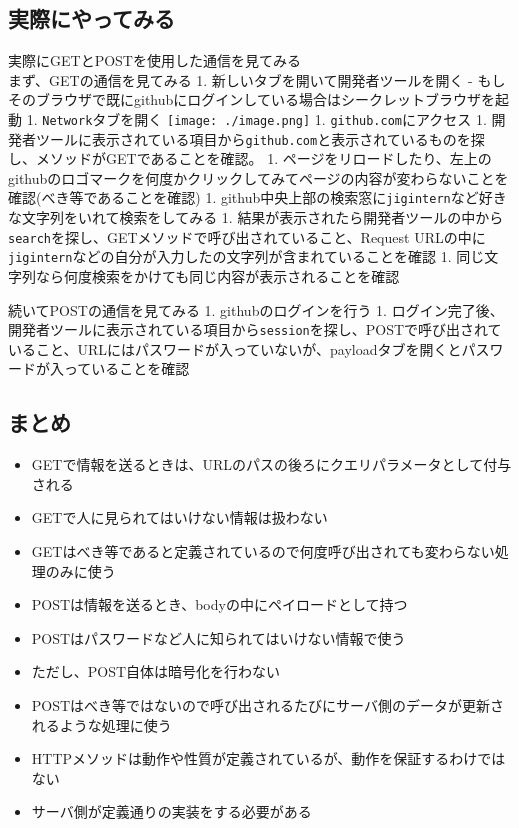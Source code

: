 \subsection{実際にやってみる}\label{ux5b9fux969bux306bux3084ux3063ux3066ux307fux308b}

実際にGETとPOSTを使用した通信を見てみる\\
まず、GETの通信を見てみる 1. 新しいタブを開いて開発者ツールを開く -
もしそのブラウザで既にgithubにログインしている場合はシークレットブラウザを起動
1. \texttt{Network}タブを開く \texttt{[image: ./image.png]} 1.
\texttt{github.com}にアクセス 1.
開発者ツールに表示されている項目から\texttt{github.com}と表示されているものを探し、メソッドがGETであることを確認。
1.
ページをリロードしたり、左上のgithubのロゴマークを何度かクリックしてみてページの内容が変わらないことを確認(べき等であることを確認)
1.
github中央上部の検索窓に\texttt{jigintern}など好きな文字列をいれて検索をしてみる
1.
結果が表示されたら開発者ツールの中から\texttt{search}を探し、GETメソッドで呼び出されていること、Request
URLの中に\texttt{jigintern}などの自分が入力したの文字列が含まれていることを確認
1. 同じ文字列なら何度検索をかけても同じ内容が表示されることを確認

続いてPOSTの通信を見てみる 1. githubのログインを行う 1.
ログイン完了後、開発者ツールに表示されている項目から\texttt{session}を探し、POSTで呼び出されていること、URLにはパスワードが入っていないが、payloadタブを開くとパスワードが入っていることを確認

\subsection{まとめ}\label{ux307eux3068ux3081}

\begin{itemize}
\item
  GETで情報を送るときは、URLのパスの後ろにクエリパラメータとして付与される
\item
  GETで人に見られてはいけない情報は扱わない
\item
  GETはべき等であると定義されているので何度呼び出されても変わらない処理のみに使う
\item
  POSTは情報を送るとき、bodyの中にペイロードとして持つ
\item
  POSTはパスワードなど人に知られてはいけない情報で使う
\item
  ただし、POST自体は暗号化を行わない
\item
  POSTはべき等ではないので呼び出されるたびにサーバ側のデータが更新されるような処理に使う
\item
  HTTPメソッドは動作や性質が定義されているが、動作を保証するわけではない
\item
  サーバ側が定義通りの実装をする必要がある
\end{itemize}


